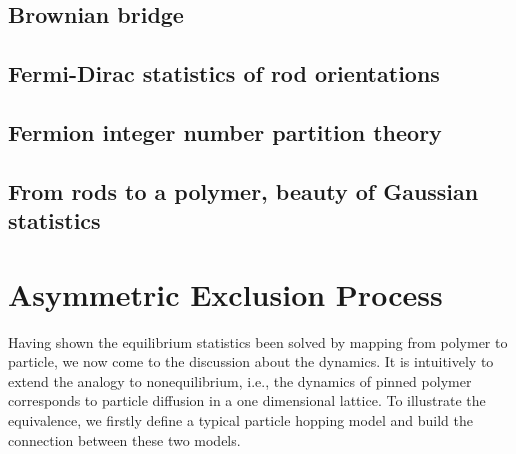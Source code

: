 \documentclass[aps,showpacs,twocolumn,floatfix,prx,superscriptaddress]{revtex4-1}
\begin{document}
%
%

\subsection{Brownian bridge}
\subsection{Fermi-Dirac statistics of rod orientations}
\subsection{Fermion integer number partition theory}
\subsection{From rods to a polymer, beauty of Gaussian statistics}

\section{Asymmetric Exclusion Process}
Having shown the equilibrium statistics been solved by mapping from polymer to
particle, we now come to the discussion about the dynamics. It is intuitively to
extend the analogy to nonequilibrium, i.e., the dynamics of pinned polymer
corresponds to particle diffusion in a one dimensional lattice. To illustrate
the equivalence, we firstly define a typical particle hopping model and build
the connection between these two models. 
\end{document}
